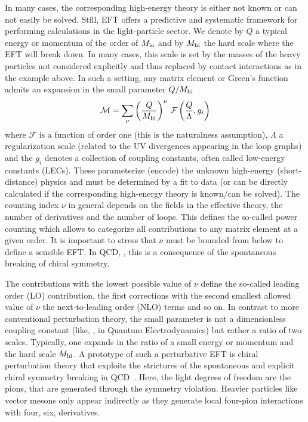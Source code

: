 In many cases, the corresponding high-energy theory
is either not known or can not easily be solved. 
Still, EFT offers a predictive
and systematic framework for performing calculations in the
light-particle sector. We denote by $Q$ a typical energy
or momentum of the order of $M_{\rm lo}$ and by $M_{\rm hi}$ the
hard scale where the EFT will break down. In many cases, this
scale is set by the masses of the heavy particles not considered
explicitly and thus replaced by contact interactions as in the example above.  
In such a setting, any matrix element or Green's
function admits an expansion in the small parameter 
$Q/M_{\rm hi}$~\cite{Weinberg:1978kz}
\begin{equation}
 {\mathcal M} = \sum\limits_{\nu} \left(\frac{Q}{M_{\rm hi}}\right)^{\nu}  
 \,{\mathcal F} \left(\frac{Q}{\Lambda}, g_i\right)
\end{equation}
where ${\mathcal F}$ is a function of order one (this is the naturalness
assumption), $\Lambda$
a regularization scale (related to the UV divergences appearing
in the loop graphs) and the $g_i$ denotes a collection of
coupling constants, often called low-energy constants (LECs).
These parameterize (encode) the unknown high-energy (short-distance)
physics and must be determined by a fit to data (or
can be directly calculated if the corresponding high-energy theory
is known/can be solved). The counting index $\nu$ in general depends 
on the fields in the effective theory, the number of derivatives and
the number of loops. This defines the so-called power counting 
which allows to categorize all contributions to any matrix element
at a given order. It is important to stress that $\nu$ must be
bounded from below to define a sensible EFT. In QCD, \eg, this is 
a consequence of the spontaneous breaking of chiral symmetry. 

The contributions with the lowest possible value of $\nu$ 
define the so-called leading order (LO) contribution, the first
corrections with the second smallest allowed value of $\nu$ the
next-to-leading order (NLO) terms and so on. In contrast to more
conventional perturbation theory, the small parameter is not a 
dimensionless coupling constant (like, \eg, in Quantum Electrodynamics) 
but rather a ratio of two scales. Typically, one
expands in the ratio of a small energy or momentum and 
the hard scale $M_{\rm hi}$. A prototype of such
a perturbative EFT is chiral perturbation theory that exploits the
strictures of the spontaneous and explicit chiral symmetry breaking
in QCD~\cite{Gasser:1983yg,Gasser:1984gg}.  Here, the light degrees
of freedom are the pions, that are generated through the symmetry violation.
Heavier particles like \eg vector mesons only appear indirectly
as they generate local four-pion interactions with four, six, \etc
derivatives.

